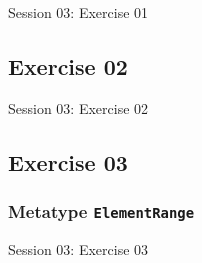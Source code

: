 \documentclass[11pt]{beamer}
\begin{document}
\begin{frame}[fragile]
\Huge
\begin{center}
Session 03: Exercise 01
\end{center}
\end{frame}

\subsection{Exercise 02}

\begin{frame}[fragile]
\Huge
\begin{center}
Session 03: Exercise 02
\end{center}
\end{frame}

\subsection{Exercise 03}

\begin{frame}[fragile]
\frametitle{Metatype \texttt{ElementRange}}
\end{frame}

\begin{frame}[fragile]
\Huge
\begin{center}
Session 03: Exercise 03
\end{center}
\end{frame}
\end{document}
